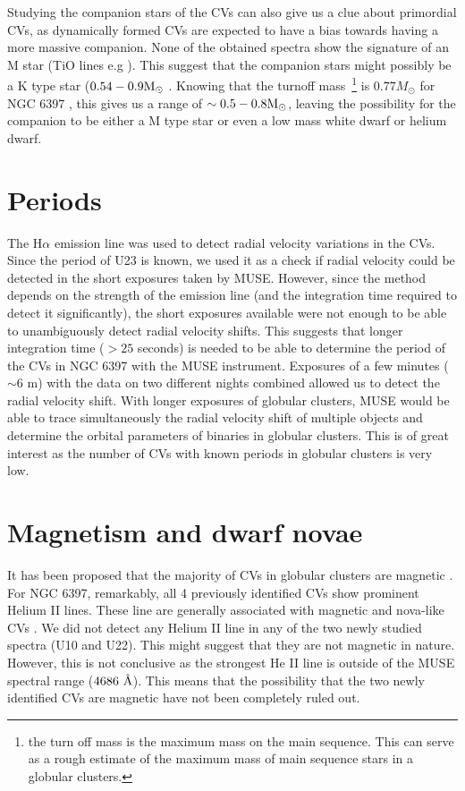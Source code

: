 Studying the companion stars of the CVs can also give us a clue about primordial CVs, as dynamically formed CVs are expected to have a bias towards having a more massive companion. None of the obtained spectra show the signature of an M star (TiO lines e.g \citep{Marsh_secondary_1990}). This suggest that the companion stars might possibly be a K type star ($0.54 - 0.9 \text M _\odot$ \citep{gray2005observation}. Knowing that the turnoff mass~\footnote{the turn off mass is the maximum mass on the main sequence. This can serve as a rough estimate of the maximum mass of main sequence stars in a globular clusters.} is $0.77 M_\odot$ for NGC 6397 \citep{de_marco_spectroscopic_2005}, this gives us a range of $\sim 0.5 - 0.8 \text M _\odot$, leaving the possibility for the companion to be either a M type star or even a low mass white dwarf or helium dwarf.

\section{Periods}

The H$\alpha$ emission line was used to detect radial velocity variations in the CVs. Since the period of U23 is known, we used it as a check if radial velocity could be detected in the short exposures taken by MUSE. However, since the method depends on the strength of the emission line (and the integration time required to detect it significantly), the short exposures available were not enough to be able to unambiguously detect radial velocity shifts. This suggests that longer integration time ($> 25$ seconds) is needed to be able to determine the period of the CVs in NGC 6397 with the MUSE instrument. Exposures of a few minutes ($\sim 6 \text{ m}$) with the data on two different nights combined allowed us to detect the radial velocity shift. With longer exposures of globular clusters, MUSE would be able to trace simultaneously the radial velocity shift of multiple objects and determine the orbital parameters of binaries in globular clusters. This is of great interest as the number of CVs with known periods in globular clusters is very low.  

\section{Magnetism and dwarf novae}

It has been proposed that the majority of CVs in globular clusters are magnetic \citep{grindlay_magnetic_1999}. For NGC 6397, remarkably, all 4 previously identified CVs show prominent Helium II lines. These line are generally associated with magnetic and nova-like CVs \citep{echevarria_statistical_1988}. We did not detect any Helium II line in any of the two newly studied spectra (U10 and U22). This might suggest that they are not magnetic in nature. However, this is not conclusive as the strongest He II line is outside of the MUSE spectral range ($4686 \text{ \r A}$). This means that the possibility that the two newly identified CVs are magnetic have not been completely ruled out. 

